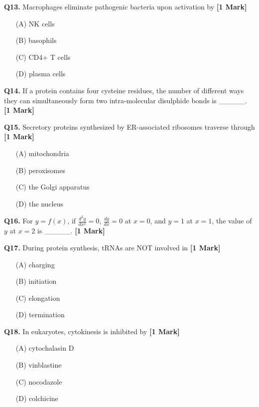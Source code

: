 \documentclass[11pt]{article}
\newcommand{\questiona}[2]{
    \noindent\textbf{Q#2.} #1 \hfill \textbf{[1 Mark]}
}
\begin{document}
\vspace{0.5cm}

\questiona{Macrophages eliminate pathogenic bacteria upon activation by}{13}
\begin{enumerate}
    \item[(A)] NK cells
    \item[(B)] basophils  
    \item[(C)] CD4+ T cells
    \item[(D)] plasma cells
\end{enumerate}

\vspace{0.5cm}

\questiona{If a protein contains four cysteine residues, the number of different ways they can simultaneously form two intra-molecular disulphide bonds is \_\_\_\_\_.}{14}

\vspace{0.5cm}

\questiona{Secretory proteins synthesized by ER-associated ribosomes traverse through}{15}
\begin{enumerate}
    \item[(A)] mitochondria
    \item[(B)] peroxisomes  
    \item[(C)] the Golgi apparatus
    \item[(D)] the nucleus
\end{enumerate}

\vspace{0.5cm}

\questiona{For $y = f(x)$, if $\frac{d^2 y}{dx^2} = 0$, $\frac{dy}{dx} = 0$ at $x = 0$, and $y = 1$ at $x = 1$, the value of $y$ at $x = 2$ is \_\_\_\_\_.}{16}

\vspace{0.5cm}

\questiona{During protein synthesis, tRNAs are NOT involved in}{17}
\begin{enumerate}
    \item[(A)] charging
    \item[(B)] initiation  
    \item[(C)] elongation
    \item[(D)] termination
\end{enumerate}

\vspace{0.5cm}

\questiona{In eukaryotes, cytokinesis is inhibited by}{18}
\begin{enumerate}
    \item[(A)] cytochalasin D
    \item[(B)] vinblastine  
    \item[(C)] nocodazole
    \item[(D)] colchicine
\end{enumerate}
\end{document}
